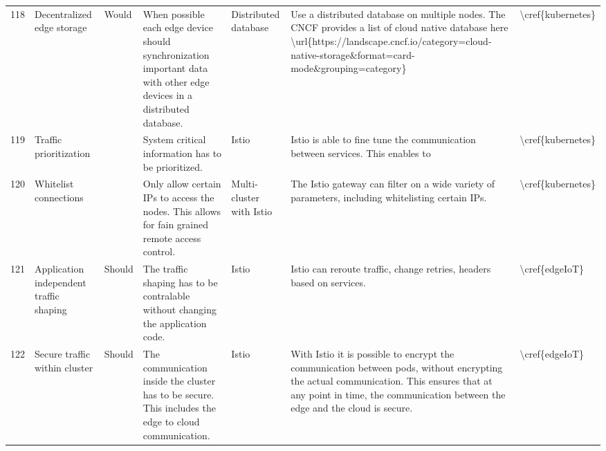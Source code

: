 \begin{longtable}{l p{1.5cm} l p{4cm} p{2cm} p{4cm} l }
118 & Decentralized edge storage              & Would          & When possible each edge device should synchronization important data with other edge devices in a distributed database.                                                                    & Distributed database     & Use a distributed database on multiple nodes. The CNCF provides a list of cloud native database here \textbackslash{}url\{https://landscape.cncf.io/category=cloud-native-storage\&format=card-mode\&grouping=category\}       & \textbackslash{}cref\{kubernetes\} \\
119 & Traffic prioritization                  &                & System critical information has to be prioritized.                                                                                                                                         & Istio                    & Istio is able to fine tune the communication between services. This enables to                                                                                                                                                 & \textbackslash{}cref\{kubernetes\} \\
120 & Whitelist connections                   &                & Only allow certain IPs to access the nodes. This allows for fain grained remote access control.                                                                                            & Multi-cluster with Istio & The Istio gateway can filter on a wide variety of parameters, including whitelisting certain IPs.                                                                                                                              & \textbackslash{}cref\{kubernetes\} \\
121 & Application independent traffic shaping & Should         & The traffic shaping has to be contralable without changing the application code.                                                                                                           & Istio                    & Istio can reroute traffic, change retries, headers based on services.                                                                                                                                                          & \textbackslash{}cref\{edgeIoT\}    \\
122 & Secure traffic within cluster           & Should         & The communication inside the cluster has to be secure. This includes the edge to cloud communication.                                                                                      & Istio                    & With Istio it is possible to encrypt the communication between pods, without encrypting the actual communication. This ensures that at any point in time, the communication between the edge and the cloud is secure.          & \textbackslash{}cref\{edgeIoT\}    \\

\end{longtable}
